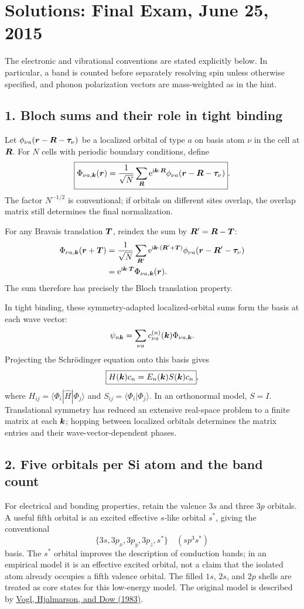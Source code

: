 \chapter{Solutions: Final Exam, June 25, 2015}
\label{s:physics-2015-06-final}
The electronic and vibrational conventions are stated explicitly below. In particular, a band is counted before separately resolving spin unless otherwise specified, and phonon polarization vectors are mass-weighted as in the hint.

\section*{1. Bloch sums and their role in tight binding}
Let $\phi_{\nu a}(\boldsymbol{r}-\boldsymbol{R}-\boldsymbol{\tau}_\nu)$ be a localized orbital of type $a$ on basis atom $\nu$ in the cell at $\boldsymbol{R}$. For $N$ cells with periodic boundary conditions, define
\[
\boxed{\Phi_{\nu a,\boldsymbol{k}}(\boldsymbol{r})
=\frac1{\sqrt N}\sum_{\boldsymbol{R}}\mathrm{e}^{\mathrm{i}\boldsymbol{k}\cdot\boldsymbol{R}}
\phi_{\nu a}(\boldsymbol{r}-\boldsymbol{R}-\boldsymbol{\tau}_\nu)}.
\]
The factor $N^{-1/2}$ is conventional; if orbitals on different sites overlap, the overlap matrix still determines the final normalization.

For any Bravais translation $\boldsymbol{T}$, reindex the sum by $\boldsymbol{R}'=\boldsymbol{R}-\boldsymbol{T}$:
\begin{align*}
\Phi_{\nu a,\boldsymbol{k}}(\boldsymbol{r}+\boldsymbol{T})
&=\frac1{\sqrt N}\sum_{\boldsymbol{R}'}
\mathrm{e}^{\mathrm{i}\boldsymbol{k}\cdot(\boldsymbol{R}'+\boldsymbol{T})}
\phi_{\nu a}(\boldsymbol{r}-\boldsymbol{R}'-\boldsymbol{\tau}_\nu)\\
&=\mathrm{e}^{\mathrm{i}\boldsymbol{k}\cdot\boldsymbol{T}}\Phi_{\nu a,\boldsymbol{k}}(\boldsymbol{r}).
\end{align*}
The sum therefore has precisely the Bloch translation property.

In tight binding, these symmetry-adapted localized-orbital sums form the basis at each wave vector:
\[
\psi_{n\boldsymbol{k}}=\sum_{\nu a}c_{\nu a}^{(n)}(\boldsymbol{k})\Phi_{\nu a,\boldsymbol{k}}.
\]
Projecting the Schr\"odinger equation onto this basis gives
\[
\boxed{H(\boldsymbol{k})c_n=E_n(\boldsymbol{k})S(\boldsymbol{k})c_n},
\]
where $H_{ij}=\langle\Phi_i|\hat H|\Phi_j\rangle$ and
$S_{ij}=\langle\Phi_i|\Phi_j\rangle$. In an orthonormal model, $S=I$.
Translational symmetry has reduced an extensive real-space problem to a finite matrix at each $\boldsymbol{k}$; hopping between localized orbitals determines the matrix entries and their wave-vector-dependent phases.

\section*{2. Five orbitals per Si atom and the band count}
For electrical and bonding properties, retain the valence $3s$ and three $3p$ orbitals. A useful fifth orbital is an excited effective $s$-like orbital $s^*$, giving the conventional
\[
\boxed{\{3s,3p_x,3p_y,3p_z,s^*\}\quad(sp^3s^*)}
\]
basis. The $s^*$ orbital improves the description of conduction bands; in an empirical model it is an effective excited orbital, not a claim that the isolated atom already occupies a fifth valence orbital. The filled $1s$, $2s$, and $2p$ shells are treated as core states for this low-energy model. The original model is described by
\href{https://www.sciencedirect.com/science/article/pii/0022369783900641}{Vogl, Hjalmarson, and Dow (1983)}.

